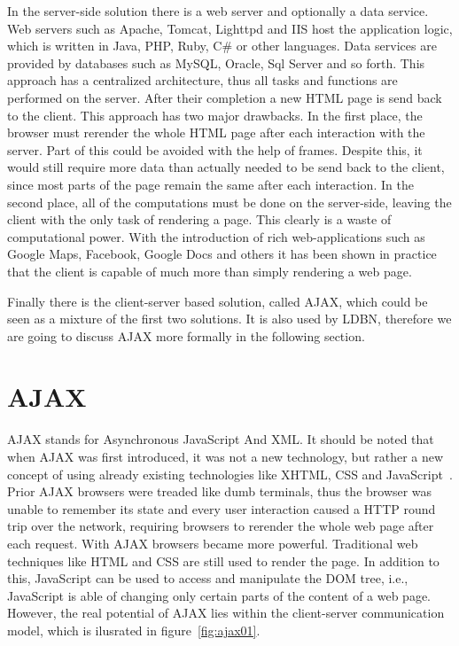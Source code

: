 In the server-side solution there is a web server and optionally a data service. 
Web servers such as Apache, Tomcat, Lighttpd and IIS host the application 
logic, which is written in Java, PHP, Ruby, C\# or other languages. 
Data services are provided by databases such as MySQL, Oracle, Sql Server and 
so forth. This approach has a centralized architecture, thus all tasks and 
functions are performed on the server. After their completion a new HTML page is 
send back to the client. This approach has two major drawbacks. In the first place, 
the browser must rerender the whole HTML page after each interaction with the server.
Part of this could be avoided with the help of frames. Despite this, it would still 
require more data than actually needed to be send back to the client, since most 
parts of the page remain the same after each interaction. In the second place, 
all of the computations must be done on the server-side, leaving the client with 
the only task of rendering a page. This clearly is a waste of computational power. 
With the introduction of rich web-applications such as Google Maps, Facebook, 
Google Docs and others it has been shown in practice that the client is capable of 
much more than simply rendering a web page. 

Finally there is the client-server based solution, called AJAX, which could be
seen as a mixture 
of the first two solutions. It is also used by LDBN, therefore we are going to
discuss AJAX more formally in the following section.

\section{AJAX}
\label{sec:ajax}
AJAX stands for Asynchronous JavaScript And XML. It should be noted
that when AJAX was first introduced, it was not a new technology, 
but rather a new concept of using already existing technologies like XHTML, 
CSS and JavaScript~\cite{w3}.  Prior AJAX browsers were treaded 
like dumb terminals, thus the browser was unable to remember its state and every 
user interaction caused a HTTP round trip over the network, requiring browsers 
to rerender the whole web page after each request. With AJAX browsers became 
more powerful. Traditional web techniques like HTML and CSS are still used to 
render the page. In addition to this, JavaScript can be used to access 
and manipulate the DOM tree, i.e., JavaScript is able of changing only certain parts
of the content of a web page. However, the
real potential of AJAX lies within the client-server communication model, which 
is ilusrated in figure~\ref{fig:ajax01}.  

